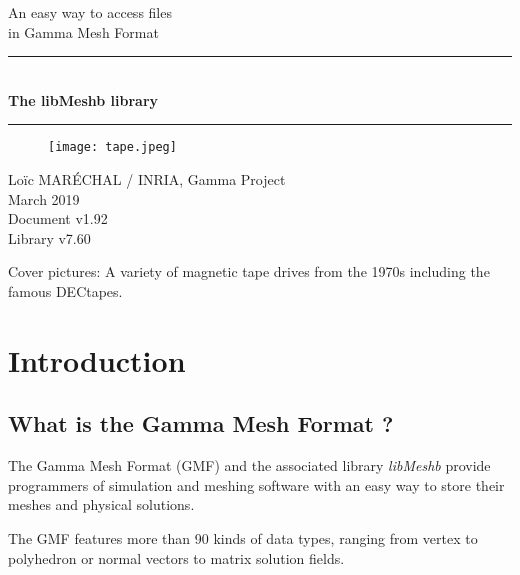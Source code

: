 \documentclass[a4paper,12pt]{article}
\newcommand{\HRule}{\rule{\linewidth}{1mm}}
\begin{document}
%
%

\begin{titlepage}

\begin{center}
\huge An easy way to access files\\ in Gamma Mesh Format
\HRule \\
\medskip
{\Huge \bfseries The libMeshb library} \\
\HRule
\end{center}

\vfill

\begin{figure}[htbp]
\begin{center}
\texttt{[image: tape.jpeg]}
\end{center}
\end{figure}

\vfill

\begin{flushright}
\Large Lo\"ic MAR\'ECHAL / INRIA, Gamma Project\\
\Large March 2019 \\
\normalsize Document v1.92 \\
\normalsize Library v7.60
\end{flushright}

\end{titlepage}

\clearpage

\setcounter{tocdepth}{2}
\tableofcontents
\vfill

\footnotesize{Cover pictures: A variety of magnetic tape drives from the 1970s including the famous DECtapes.}
\normalsize

\clearpage


%
%

\section{Introduction}

\subsection{What is the Gamma Mesh Format ?}
The Gamma Mesh Format (GMF) and the associated library \emph{libMeshb} provide programmers of simulation and meshing software with an easy way to store their meshes and physical solutions.

The GMF features more than 90 kinds of data types, ranging from vertex to polyhedron or normal vectors to matrix solution fields.
\end{document}
